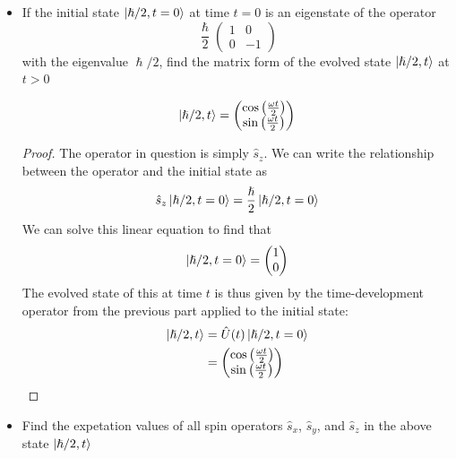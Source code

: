 \documentclass[a4paper]{article}
\begin{document}
\begin{enumerate}
\begin{itemize}
\begin{ans}
\begin{proof}
\begin{align*}
\begin{pmatrix}
					-\sin\left(\frac{\omega t}{2}\right)\\
					\sin\left(\frac{\omega t}{2}\right)&
					\cos\left(\frac{\omega t}{2}\right)
				\end{pmatrix}
			\end{align*}
		\end{proof}
		\end{ans}
		\item If the initial state $\left\lvert \hslash/2,t=0\right\rangle$ at time $t=0$
			is an eigenstate of the operator
			\[ \frac{\hslash}{2}
				\begin{pmatrix}1&0\\0&-1\end{pmatrix} \]
			with the eigenvalue $\hslash/2$, find the matrix form
			of the evolved state $\left\lvert \hslash/2,t\right\rangle$ at
			$t>0$
		\begin{ans}
			\[
				\left\lvert \hslash/2,t\right\rangle =
				\begin{pmatrix}
					\cos\left(\frac{\omega t}{2}\right)\\
					\sin\left(\frac{\omega t}{2}\right)
				\end{pmatrix}
			\]
		\begin{proof}
			The operator in question is simply $\hat{s}_z$. We can
			write the relationship between the operator and the
			initial state as
			\[ \hat{s}_z\left\lvert \hslash/2,t=0\right\rangle = \frac{\hslash}{2}
			\left\lvert \hslash/2,t=0\right\rangle \]
			We can solve this linear equation to find that
			\[ \left\lvert \hslash/2,t=0\right\rangle =
			\begin{pmatrix}1\\0\end{pmatrix}\]
			The evolved state of this at time $t$ is thus given
			by the time-development operator from the previous
			part applied to the initial state:
			\begin{align*}
				\left\lvert \hslash/2,t\right\rangle &= \hat{U}(t)
					\left\lvert \hslash/2,t=0\right\rangle\\
				&= \begin{pmatrix}
					\cos\left(\frac{\omega t}{2}\right)\\
					\sin\left(\frac{\omega t}{2}\right)
				\end{pmatrix}
			\end{align*}
		\end{proof}
		\end{ans}
		\item Find the expetation values of all spin operators
			$\hat{s}_x$, $\hat{s}_y$, and $\hat{s}_z$ in the
			above state $\left\lvert \hslash/2,t\right\rangle$
		\begin{ans}

\end{ans}
\end{itemize}
\end{enumerate}
\end{document}
